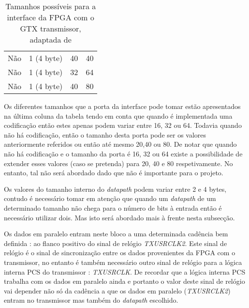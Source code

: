 \begin{table}[h!]
{\begin{tabular}{rlll}
			\multicolumn{1}{r|}{Não}                        & 1 (4 byte)                                       & 40                                           & 40                                                \\
			\multicolumn{1}{r|}{Não}                        & 1 (4 byte)                                       & 32                                           & 64                                                \\
			\multicolumn{1}{r|}{Não}                        & 1 (4 byte)                                       & 40                                           & 80                                                \\ \hline
		\end{tabular}%
	}
	\caption{Tamanhos possíveis para a interface da FPGA com o GTX transmissor, adaptada de \cite{R011}}
	\label{table:tx_interface}
\end{table}

Os diferentes tamanhos que a porta da interface pode tomar estão apresentados na última coluna da tabela tendo em conta que quando é implementada uma codificação então estes apenas podem variar entre 16, 32 ou 64. Todavia quando não há codificação, então o tamanho desta porta pode ser os valores anteriormente referidos ou então até mesmo 20,40 ou 80. De notar que quando não há codificação e o tamanho da porta é 16, 32 ou 64 existe a possibilidade de extender esses valores (caso se pretenda) para 20, 40 e 80 respetivamente. No entanto, tal não será abordado dado que não é importante para o projeto. 

Os valores do tamanho interno do \textit{datapath} podem variar entre 2 e 4 bytes, contudo é necessário tomar em atenção que quando um \textit{datapath} de um determinado tamanho não chega para o número de bits à entrada então é necessário utilizar dois. Mas isto será abordado mais à frente nesta subsecção. 

Os dados em paralelo entram neste bloco a uma determinada cadência bem definida : ao flanco positivo do sinal de relógio \textit{TXUSRCLK2}. Este sinal de relógio é o sinal de sincronização entre os dados provenientes da FPGA com o transmissor, no entanto é também necessário outro sinal de relógio para a lógica interna PCS do transmissor : \textit{TXUSRCLK}. De recordar que a lógica interna PCS trabalha com os dados em paralelo ainda e portanto o valor deste sinal de relógio vai depender não só da cadência a que os dados em paralelo (\textit{TXUSRCLK2}) entram no transmissor mas também do \textit{datapath} escolhido.

